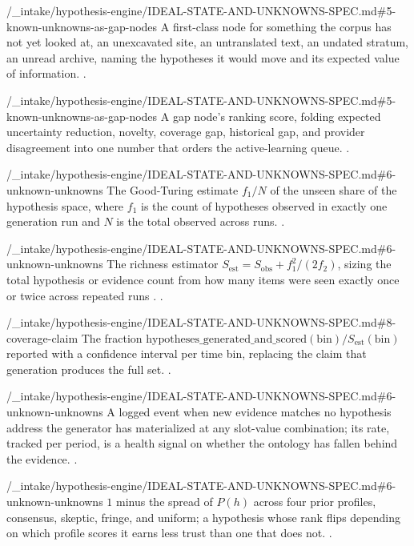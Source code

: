 %
  {\bktrepo/_intake/hypothesis-engine/IDEAL-STATE-AND-UNKNOWNS-SPEC.md\#5-known-unknowns-as-gap-nodes}%
  {A first-class node for something the corpus has not yet looked at, an
   unexcavated site, an untranslated text, an undated stratum, an unread
   archive, naming the hypotheses it would move and its expected value of
   information. .}

%
  {\bktrepo/_intake/hypothesis-engine/IDEAL-STATE-AND-UNKNOWNS-SPEC.md\#5-known-unknowns-as-gap-nodes}%
  {A gap node's ranking score, folding expected uncertainty reduction,
   novelty, coverage gap, historical gap, and provider disagreement into
   one number that orders the active-learning queue. .}

%
  {\bktrepo/_intake/hypothesis-engine/IDEAL-STATE-AND-UNKNOWNS-SPEC.md\#6-unknown-unknowns}%
  {The Good-Turing estimate $f_1/N$ of the unseen share of the hypothesis
   space, where $f_1$ is the count of hypotheses observed in exactly one
   generation run and $N$ is the total observed across runs.
   .}

%
  {\bktrepo/_intake/hypothesis-engine/IDEAL-STATE-AND-UNKNOWNS-SPEC.md\#6-unknown-unknowns}%
  {The richness estimator $S_{\mathrm{est}} = S_{\mathrm{obs}} +
   f_1^2/(2f_2)$, sizing the total hypothesis or evidence count from how
   many items were seen exactly once or twice across repeated runs
   \autocite{colwell1994estimating,chao1987estimating}. .}

%
  {\bktrepo/_intake/hypothesis-engine/IDEAL-STATE-AND-UNKNOWNS-SPEC.md\#8-coverage-claim}%
  {The fraction $\mathrm{hypotheses\_generated\_and\_scored}(\mathrm{bin}) /
   S_{\mathrm{est}}(\mathrm{bin})$ reported with a confidence interval per
   time bin, replacing the claim that generation produces the full set.
   .}

%
  {\bktrepo/_intake/hypothesis-engine/IDEAL-STATE-AND-UNKNOWNS-SPEC.md\#6-unknown-unknowns}%
  {A logged event when new evidence matches no hypothesis address the
   generator has materialized at any slot-value combination; its rate,
   tracked per period, is a health signal on whether the ontology has
   fallen behind the evidence. .}

%
  {\bktrepo/_intake/hypothesis-engine/IDEAL-STATE-AND-UNKNOWNS-SPEC.md\#6-unknown-unknowns}%
  {$1$ minus the spread of $P(h)$ across four prior profiles, consensus,
   skeptic, fringe, and uniform; a hypothesis whose rank flips depending on
   which profile scores it earns less trust than one that does not.
   .}


